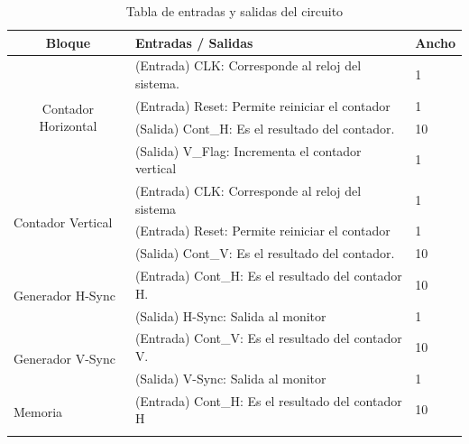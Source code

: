 \documentclass[12pt,a4paper]{article}
\begin{document}
\begin{table}[]
	\centering
	\caption{Tabla de entradas y salidas del circuito}
	\label{tbl:IO3}
	\begin{tabular}{|l|l|l|}
		\hline
		\multicolumn{1}{|c|}{\textbf{Bloque}}                      & \textbf{Entradas / Salidas}                                          & \textbf{Ancho} \\ \hline
		\multicolumn{1}{|c|}{\multirow{4}{*}{Contador Horizontal}} & (Entrada) CLK: Corresponde al reloj del sistema.                     & 1              \\ \cline{2-3} 
		\multicolumn{1}{|c|}{}                                     & (Entrada) Reset: Permite reiniciar el contador                       & 1              \\ \cline{2-3} 
		\multicolumn{1}{|c|}{}                                     & (Salida) Cont\_H: Es el resultado del contador.                      & 10             \\ \cline{2-3} 
		\multicolumn{1}{|c|}{}                                     & (Salida) V\_Flag: Incrementa el contador vertical                    & 1              \\ \hline
		\multirow{3}{*}{Contador Vertical}                         & (Entrada) CLK: Corresponde al reloj del sistema                      & 1              \\ \cline{2-3} 
		& (Entrada) Reset: Permite reiniciar el contador                       & 1              \\ \cline{2-3} 
		& (Salida) Cont\_V: Es el resultado del contador.                      & 10             \\ \hline
		\multirow{2}{*}{Generador H-Sync}                          & (Entrada) Cont\_H: Es el resultado del contador H.                   & 10             \\ \cline{2-3} 
		& (Salida) H-Sync: Salida al monitor                                   & 1              \\ \hline
		\multirow{2}{*}{Generador V-Sync}                          & (Entrada) Cont\_V: Es el resultado del contador V.                   & 10             \\ \cline{2-3} 
		& (Salida) V-Sync: Salida al monitor                                   & 1              \\ \hline
		\multirow{4}{*}{Memoria}                                   & (Entrada) Cont\_H: Es el resultado del contador H                    & 10             \\ \cline{2-3} 

\end{tabular}
\end{table}
\end{document}
